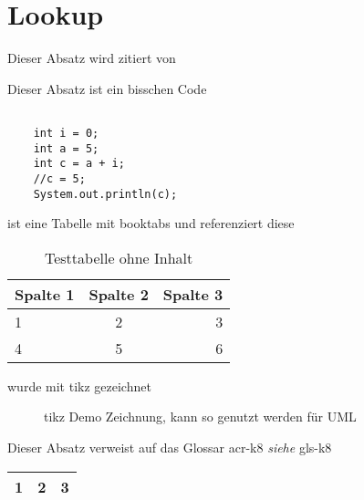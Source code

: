 \chapter{Lookup}
\blindtext

Dieser Absatz wird zitiert von \citep{Heo2015Control}

Dieser Absatz ist ein bisschen Code
\lstset{language=java, caption=Deklarieren von Variablen in Java }
\begin{lstlisting}

	int i = 0;
	int a = 5;
	int c = a + i;
	//c = 5;
	System.out.println(c);
\end{lstlisting}

\blindtext

 ist eine Tabelle mit booktabs und referenziert diese \\
\begin{table}[h]
	\begin{center}
		\begin{tabular}{lcr}
			\toprule
			Spalte 1 & Spalte 2 & Spalte 3 \\
			\midrule
			1 & 2 & 3 \\
			4 & 5 & 6 \\
			\bottomrule
		\end{tabular}
	\end{center}
	\caption{Testtabelle ohne Inhalt}
	\label{tab:Testtable}
\end{table}

 wurde mit tikz gezeichnet\\

\begin{figure}[h]
	\centering
	\caption{tikz Demo Zeichnung, kann so genutzt werden für UML}
	\label{fig:tikzuml}
\end{figure}

Dieser Absatz verweist auf das Glossar
\gls{acr-k8} \emph{siehe} \gls{gls-k8}

\begin{tabular}{|c|c|c|}
	\hline 
	\cellcolor{green} 1 & \cellcolor{red} 2 & \cellcolor{yellow} 3\\
	\hline 
\end{tabular} 

